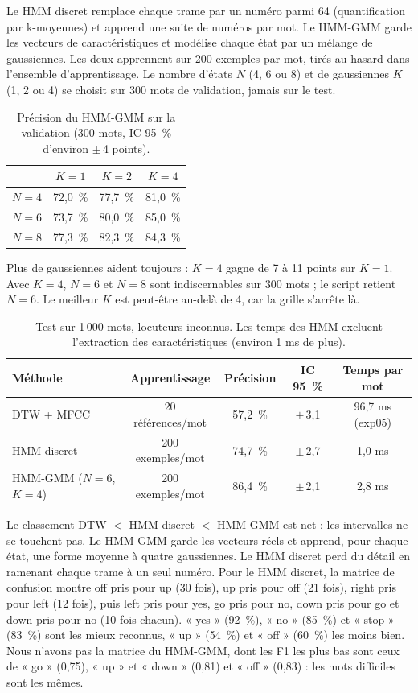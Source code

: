 Le HMM discret remplace chaque trame par un numéro parmi 64 (quantification par k-moyennes) et apprend une suite de numéros par mot. Le HMM-GMM garde les vecteurs de caractéristiques et modélise chaque état par un mélange de gaussiennes. Les deux apprennent sur 200 exemples par mot, tirés au hasard dans l'ensemble d'apprentissage. Le nombre d'états $N$ (4, 6 ou 8) et de gaussiennes $K$ (1, 2 ou 4) se choisit sur 300 mots de validation, jamais sur le test.

\begin{table}[ht]
  \centering
  \begin{tabular}{lccc}
    \toprule
    & $K = 1$ & $K = 2$ & $K = 4$\\
    \midrule
    $N = 4$ & 72,0~\% & 77,7~\% & 81,0~\%\\
    $N = 6$ & 73,7~\% & 80,0~\% & 85,0~\%\\
    $N = 8$ & 77,3~\% & 82,3~\% & 84,3~\%\\
    \bottomrule
  \end{tabular}
  \caption{Précision du HMM-GMM sur la validation (300 mots, IC 95~\% d'environ $\pm$\,4 points).}
\end{table}

Plus de gaussiennes aident toujours : $K = 4$ gagne de 7 à 11 points sur $K = 1$. Avec $K = 4$, $N = 6$ et $N = 8$ sont indiscernables sur 300 mots ; le script retient $N = 6$. Le meilleur $K$ est peut-être au-delà de 4, car la grille s'arrête là.

\begin{table}[ht]
  \centering
  \begin{tabular}{lcccc}
    \toprule
    Méthode & Apprentissage & Précision & IC 95~\% & Temps par mot\\
    \midrule
    DTW + MFCC & 20 références/mot & 57,2~\% & $\pm$\,3,1 & 96,7 ms (exp05)\\
    HMM discret & 200 exemples/mot & 74,7~\% & $\pm$\,2,7 & 1,0 ms\\
    HMM-GMM ($N = 6$, $K = 4$) & 200 exemples/mot & 86,4~\% & $\pm$\,2,1 & 2,8 ms\\
    \bottomrule
  \end{tabular}
  \caption{Test sur 1\,000 mots, locuteurs inconnus. Les temps des HMM excluent l'extraction des caractéristiques (environ 1 ms de plus).}
  \label{tab:hmm}
\end{table}

Le classement DTW $<$ HMM discret $<$ HMM-GMM est net : les intervalles ne se touchent pas. Le HMM-GMM garde les vecteurs réels et apprend, pour chaque état, une forme moyenne à quatre gaussiennes. Le HMM discret perd du détail en ramenant chaque trame à un seul numéro. Pour le HMM discret, la matrice de confusion montre off pris pour up (30 fois), up pris pour off (21 fois), right pris pour left (12 fois), puis left pris pour yes, go pris pour no, down pris pour go et down pris pour no (10 fois chacun). « yes » (92~\%), « no » (85~\%) et « stop » (83~\%) sont les mieux reconnus, « up » (54~\%) et « off » (60~\%) les moins bien. Nous n'avons pas la matrice du HMM-GMM, dont les F1 les plus bas sont ceux de « go » (0,75), « up » et « down » (0,81) et « off » (0,83) : les mots difficiles sont les mêmes.

